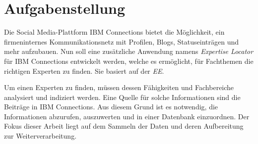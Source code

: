 
\chapter{Aufgabenstellung}
Die Social Media-Plattform IBM Connections bietet die Möglichkeit, ein firmeninternes Kommunikationsnetz mit Profilen, Blogs, Statuseinträgen und mehr aufzubauen. Nun soll eine zusätzliche Anwendung namens \textit{Expertise Locator} für IBM Connections entwickelt werden, welche es ermöglicht, für Fachthemen die richtigen Experten zu finden. Sie basiert auf der \textit{\ac{EE}}.

Um einen Experten zu finden, müssen dessen Fähigkeiten und Fachbereiche analysiert und indiziert werden. Eine Quelle für solche Informationen sind die Beiträge in IBM Connections. Aus diesem Grund ist es notwendig, die Informationen abzurufen, auszuwerten und in einer Datenbank einzuordnen. Der Fokus dieser Arbeit liegt auf dem Sammeln der Daten und deren Aufbereitung zur Weiterverarbeitung.
\newpage